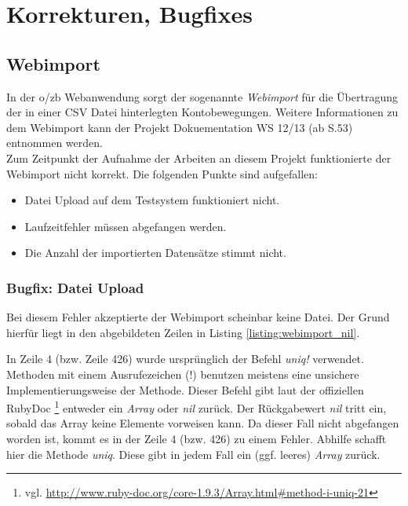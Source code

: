 \documentclass[12pt,             %
               a4paper,          %
               listof=totoc,     %
               index=totoc,      %
               bibliography=totoc,%
               oneside,         %
               BCOR1cm,          %
               english   %
               ]{scrbook}
\begin{document}


\clearpage
\chapter{Korrekturen, Bugfixes}
\section{Webimport}
In der o/zb Webanwendung sorgt der sogenannte \textit{Webimport} für die Übertragung der in einer CSV Datei hinterlegten Kontobewegungen. Weitere Informationen zu dem Webimport kann der Projekt Dokuementation WS 12/13 (ab S.53) entnommen werden.\\

Zum Zeitpunkt der Aufnahme der Arbeiten an diesem Projekt funktionierte der Webimport nicht korrekt. Die folgenden Punkte sind aufgefallen:

\begin{itemize}
     \item{Datei Upload auf dem Testsystem funktioniert nicht.}
     \item{Laufzeitfehler müssen abgefangen werden.}
     \item{Die Anzahl der importierten Datensätze stimmt nicht.} 
\end{itemize}

\subsection{Bugfix: Datei Upload}
Bei diesem Fehler akzeptierte der Webimport scheinbar keine Datei. Der Grund hierfür liegt in den abgebildeten Zeilen in Listing \vref{listing:webimport_nil}.\\

\label{listing:webimport_nil}

In Zeile 4 (bzw. Zeile 426) wurde ursprünglich der Befehl \textit{uniq!} verwendet. Methoden mit einem Ausrufezeichen (!) benutzen meistens eine unsichere Implementierungsweise der Methode. Dieser Befehl gibt laut der offiziellen RubyDoc \footnote{vgl. \url{http://www.ruby-doc.org/core-1.9.3/Array.html\#method-i-uniq-21}} entweder ein \textit{Array} oder \textit{nil} zurück. Der Rückgabewert \textit{nil} tritt ein, sobald das Array keine Elemente vorweisen kann. Da dieser Fall nicht abgefangen worden ist, kommt es in der Zeile 4 (bzw. 426) zu einem Fehler. Abhilfe schafft hier die Methode \textit{uniq}. Diese gibt in jedem Fall ein (ggf. leeres) \textit{Array} zurück. 
\end{document}
